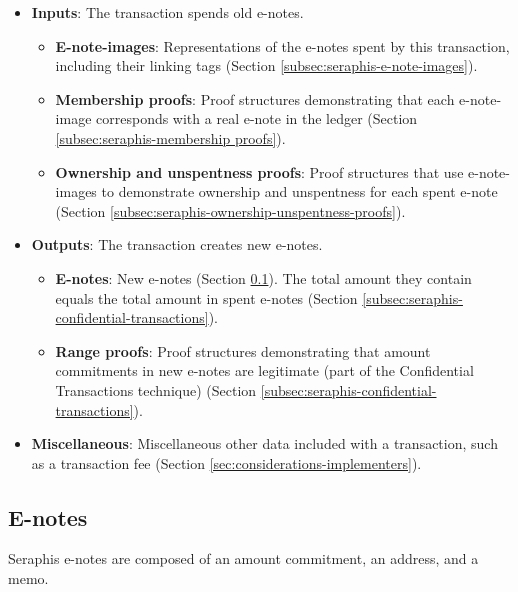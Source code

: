 \begin{itemize}
    \item \textbf{Inputs}: The transaction spends old e-notes.
    \begin{itemize}
        \item \textbf{E-note-images}: Representations of the e-notes spent by this transaction, including their linking tags (Section \ref{subsec:seraphis-e-note-images}).
        \item \textbf{Membership proofs}: Proof structures demonstrating that each e-note-image corresponds with a real e-note in the ledger (Section \ref{subsec:seraphis-membership proofs}).
        \item \textbf{Ownership and unspentness proofs}: Proof structures that use e-note-images to demonstrate ownership and unspentness for each spent e-note (Section \ref{subsec:seraphis-ownership-unspentness-proofs}).
    \end{itemize}
    \item \textbf{Outputs}: The transaction creates new e-notes.
    \begin{itemize}
        \item \textbf{E-notes}: New e-notes (Section \ref{subsec:seraphis-e-notes}). The total amount they contain equals the total amount in spent e-notes (Section \ref{subsec:seraphis-confidential-transactions}).
        \item \textbf{Range proofs}: Proof structures demonstrating that amount commitments in new e-notes are legitimate (part of the Confidential Transactions technique) (Section \ref{subsec:seraphis-confidential-transactions}).
    \end{itemize}
    \item \textbf{Miscellaneous}: Miscellaneous other data included with a transaction, such as a transaction fee (Section \ref{sec:considerations-implementers}).
\end{itemize}


\subsection{E-notes}
\label{subsec:seraphis-e-notes}

Seraphis e-notes are composed of an amount commitment, an address, and a memo.

